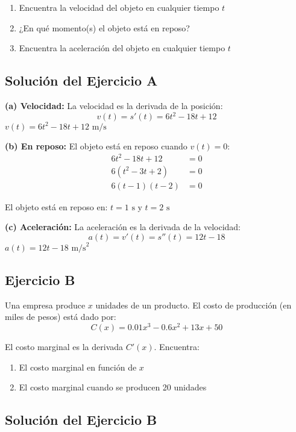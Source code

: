 \documentclass[12pt,a4paper]{article}
\begin{document}
\begin{enumerate}
	\item Encuentra la velocidad del objeto en cualquier tiempo $t$
	\item ¿En qué momento(s) el objeto está en reposo?
	\item Encuentra la aceleración del objeto en cualquier tiempo $t$
\end{enumerate}

\subsection*{Solución del Ejercicio A}

\textbf{(a) Velocidad:} La velocidad es la derivada de la posición:
\[
v(t) = s'(t) = 6t^2 - 18t + 12
\]
$\boxed{v(t) = 6t^2 - 18t + 12 \text{ m/s}}$

\bigskip

\textbf{(b) En reposo:} El objeto está en reposo cuando $v(t) = 0$:
\begin{align*}
6t^2 - 18t + 12 &= 0 \\
6(t^2 - 3t + 2) &= 0 \\
6(t - 1)(t - 2) &= 0
\end{align*}

El objeto está en reposo en: $\boxed{t = 1 \text{ s y } t = 2 \text{ s}}$

\bigskip

\textbf{(c) Aceleración:} La aceleración es la derivada de la velocidad:
\[
a(t) = v'(t) = s''(t) = 12t - 18
\]
$\boxed{a(t) = 12t - 18 \text{ m/s}^2}$

\subsection*{Ejercicio B}

Una empresa produce $x$ unidades de un producto. El costo de producción (en miles de pesos) está dado por:
\[
C(x) = 0.01x^3 - 0.6x^2 + 13x + 50
\]

El costo marginal es la derivada $C'(x)$. Encuentra:

\begin{enumerate}
	\item El costo marginal en función de $x$
	\item El costo marginal cuando se producen 20 unidades
\end{enumerate}

\subsection*{Solución del Ejercicio B}
\end{document}
